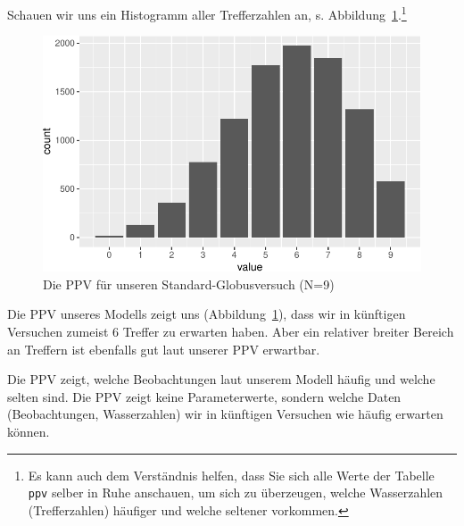 \documentclass[
  a4paper,
  DIV=11]{scrreprt}
\theoremstyle{definition}
\theoremstyle{remark}
\begin{document}
Schauen wir uns ein Histogramm aller Trefferzahlen an, s.
Abbildung~\ref{fig-ppv2}.\footnote{Es kann auch dem Verständnis helfen,
  dass Sie sich alle Werte der Tabelle \texttt{ppv} selber in Ruhe
  anschauen, um sich zu überzeugen, welche Wasserzahlen (Trefferzahlen)
  häufiger und welche seltener vorkommen.}

\begin{figure}

{\centering \includegraphics{./ppv_files/figure-pdf/fig-ppv2-1.pdf}

}

\caption{\label{fig-ppv2}Die PPV für unseren Standard-Globusversuch
(N=9)}

\end{figure}

Die PPV unseres Modells zeigt uns (Abbildung~\ref{fig-ppv2}), dass wir
in künftigen Versuchen zumeist 6 Treffer zu erwarten haben. Aber ein
relativer breiter Bereich an Treffern ist ebenfalls gut laut unserer PPV
erwartbar.

\begin{tcolorbox}[enhanced jigsaw, leftrule=.75mm, toptitle=1mm, bottomtitle=1mm, titlerule=0mm, breakable, colframe=quarto-callout-important-color-frame, title=\textcolor{quarto-callout-important-color}{\faExclamation}\hspace{0.5em}{Wichtig}, rightrule=.15mm, colback=white, arc=.35mm, left=2mm, bottomrule=.15mm, coltitle=black, opacitybacktitle=0.6, toprule=.15mm, colbacktitle=quarto-callout-important-color!10!white, opacityback=0]
Die PPV zeigt, welche Beobachtungen laut unserem Modell häufig und
welche selten sind. Die PPV zeigt keine Parameterwerte, sondern welche
Daten (Beobachtungen, Wasserzahlen) wir in künftigen Versuchen wie
häufig erwarten können.
\end{tcolorbox}
\end{document}
